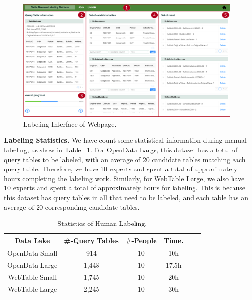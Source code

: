 \begin{figure}[h]
	\centering
	\includegraphics[width=1.0\linewidth]{fig/interface.pdf}
	\caption{Labeling Interface of Webpage.}
	\label{fig:interface}
\end{figure}

\noindent \textbf{Labeling Statistics.} 
We have count some statistical information during manual labeling, as show in Table ~\ref{Table:humanLabeling}. For OpenData Large, this dataset has a total of   query tables to be labeled, with an average of 20 candidate tables matching each query table. Therefore, we have 10 experts and spent a total of approximately  hours completing the labeling work. Similarly, for WebTable Large, we also have 10 experts and spent a total of approximately  hours for labeling. This is because this dataset has  query tables in all that need to be labeled, and each table has an average of 20 corresponding candidate tables.

\begin{table}[t]
	\centering
	\caption{Statistics of Human Labeling.}
	\begin{tabular}{|c|c|c|c|c|c|}
		\hline
		\centering
		Data Lake  & \#-Query Tables & $\#$-People & Time.   \\
		\hline  
		OpenData Small& 914  & 10 & 10h   \\
		\hline
		OpenData Large& 1,448  & 10  &  17.5h   \\
		\hline
		WebTable Small& 1,745   & 10 &  20h  \\
		\hline
		WebTable Large& 2,245  & 10 &  30h  \\
		\hline
	\end{tabular}
	\label{Table:humanLabeling}
	
\end{table}
